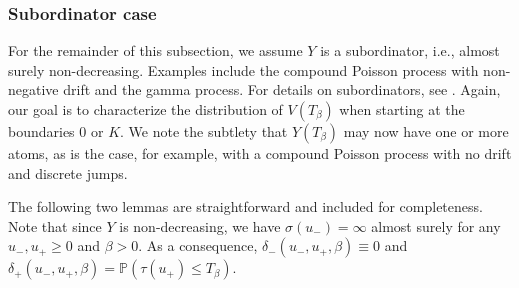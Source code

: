 \documentclass[reqno,12pt]{amsart}
\begin{document}
\subsubsection*{Subordinator case}\label{sec: prelim sub}
For the remainder of this subsection, we assume $Y$ is a subordinator, i.e., almost surely non-decreasing. Examples include the compound Poisson process with non-negative drift and the gamma process. For details on subordinators, see \cite[\S 2.6.2]{KYP}.
Again, our goal is to characterize the distribution of $V(T_\beta)$ when starting at the boundaries $0$ or $K$.
We note the subtlety that $Y(T_{\beta})$ may now have one or more atoms, as is the case, for example, with a compound Poisson process with no drift and discrete jumps.

\medskip


The following two lemmas are straightforward and included for completeness. Note that  since $Y$ is non-decreasing, we have $\sigma(u_-)=\infty$ almost surely for any $u_-,u_+\geqslant 0$ and $\beta>0$. As a consequence, $\delta_-(u_-,u_+,\beta)\equiv 0$ and $\delta_+(u_-,u_+,\beta)=\mathbb{P}(\tau(u_+)\leqslant T_\beta)$.
\end{document}
